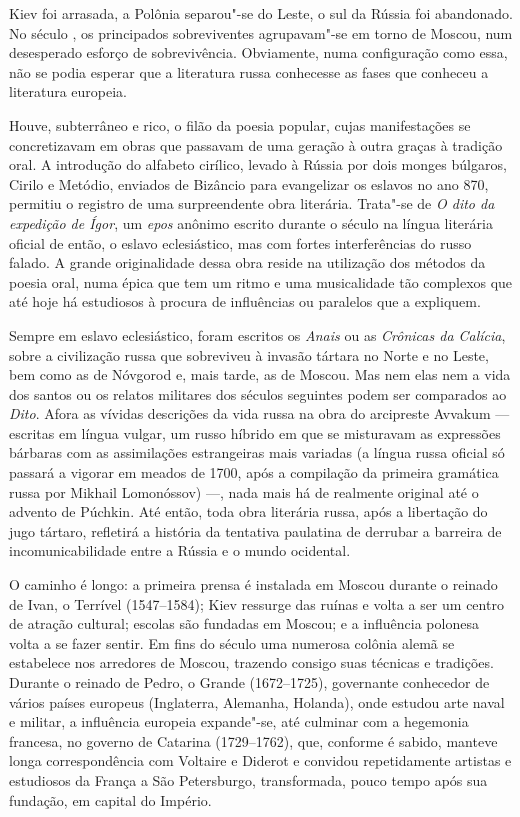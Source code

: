 Kiev foi arrasada, a Polônia separou"-se do Leste, o sul da Rússia foi
abando­nado. No século , os principados sobreviventes agrupavam"-se em
torno de Moscou, num desesperado esforço de sobrevivência. Obviamente,
numa con­figuração como essa, não se podia esperar que a literatura
russa conhecesse as fases que conheceu a literatura europeia.

Houve, subterrâneo e rico, o filão da poesia popular, cujas
manifestações se concretizavam em obras que passavam de uma geração à
outra graças à tradi­ção oral. A introdução do alfabeto cirílico,
levado à Rússia por dois monges búlgaros, Cirilo e Metódio, enviados de
Bizâncio para evangelizar os eslavos no ano 870, permitiu o registro de
uma surpreendente obra literária. Trata"-se de \emph{O dito da expedição de
Ígor}, um \emph{epos} anônimo escrito durante o século  na língua literária
oficial de então, o eslavo eclesiástico, mas com fortes interfe­rências
do russo falado. A grande originalidade dessa obra reside na utilização dos
métodos da poesia oral, numa épica que tem um ritmo e uma musicalidade
tão complexos que até hoje há estudiosos à procura de influências ou
paralelos que a expliquem.

Sempre em eslavo eclesiástico, foram escritos os \emph{Anais} ou as \emph{Crônicas da
Calícia}, sobre a civilização russa que sobreviveu à invasão tártara no Norte e
no Leste, bem como as de Nóvgorod e, mais tarde, as de Moscou. Mas nem
elas nem a vida dos santos ou os relatos militares dos séculos seguintes
podem ser comparados ao \emph{Dito}. Afora as vívidas descrições da vida russa
na obra do arcipreste Avvakum --- escritas em língua vulgar, um russo
híbrido em que se misturavam as expres­sões bárbaras com as assimilações
estrangeiras mais variadas (a língua russa oficial só passará a vigorar
em meados de 1700, após a compilação da primeira gramática russa por Mikhail Lomonóssov) ---, nada
mais há de realmente original até o advento de Púchkin. Até então, toda
obra literária russa, após a libertação do jugo tártaro, refletirá a
história da tentativa paulatina de derrubar a barreira de
incomunicabilidade entre a Rússia e o mundo ocidental.

O caminho é longo: a primeira prensa é instalada em Moscou durante o
rei­nado de Ivan, o Terrível (1547--1584); Kiev ressurge das ruínas e
volta a ser um centro de atração cultural; escolas são fundadas em
Moscou; e a influência po­lonesa volta a se fazer sentir. Em fins do
século  uma numerosa colônia alemã se estabelece nos arredores de
Moscou, trazendo consigo suas técnicas e tradições. Durante o reinado de
Pedro, o Grande (1672--1725), governante co­nhecedor de vários países
europeus (Inglaterra, Alemanha, Holanda), onde es­tudou arte naval e
militar, a influência europeia expande"-se, até culminar com a hegemonia
francesa, no governo de Catarina  (1729--1762), que, conforme é sabido,
manteve longa correspondência com Voltaire e Diderot e convidou
re­petidamente artistas e estudiosos da França a São Petersburgo,
transformada, pouco tempo após sua fundação, em
capital do Império.

